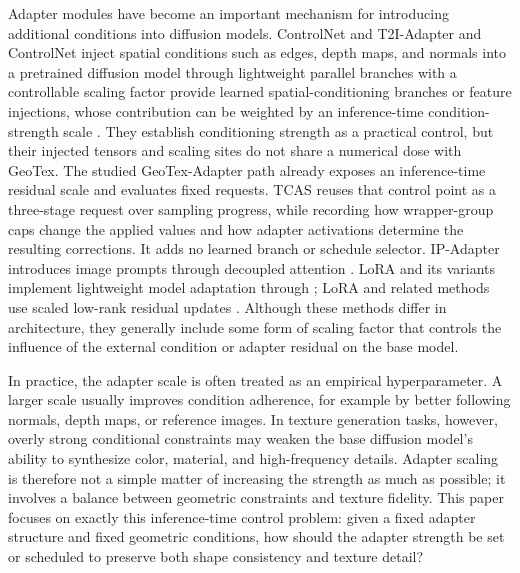 \documentclass[times,twocolumn,final]{elsarticle}
\providecommand{\DIFadd}[1]{{\protect\color{blue} \sf #1}} %
\providecommand{\DIFdel}[1]{{\protect\color{red} \scriptsize #1}} %
\providecommand{\DIFaddbegin}{} %
\providecommand{\DIFaddend}{} %
\providecommand{\DIFdelbegin}{} %
\providecommand{\DIFdelend}{} %
\begin{document}
\DIFdelbegin \DIFdel{Adapter modules have become an important mechanism for introducing additional conditions into diffusion models. }\DIFdelend \DIFaddbegin \DIFadd{ControlNet and }\DIFaddend T2I-Adapter \DIFdelbegin \DIFdel{and ControlNet inject spatial conditions such as edges, depth maps, and normals into a pretrained diffusion model through lightweight parallel branches with a controllable scaling factor \cite{mou2023t2iadapter,zhang2023controlnet}}\DIFdelend \DIFaddbegin \DIFadd{provide learned spatial-conditioning branches or feature injections, whose contribution can be weighted by an inference-time condition-strength scale \cite{mou2023t2iadapter,zhang2023controlnet}. They establish conditioning strength as a practical control, but their injected tensors and scaling sites do not share a numerical dose with GeoTex. The studied GeoTex-Adapter path already exposes an inference-time residual scale and evaluates fixed requests. TCAS reuses that control point as a three-stage request over sampling progress, while recording how wrapper-group caps change the applied values and how adapter activations determine the resulting corrections. It adds no learned branch or schedule selector}\DIFaddend . IP-Adapter introduces image prompts through decoupled attention \cite{ye2023ipadapter}\DIFdelbegin \DIFdel{. LoRA and its variants implement lightweight model adaptation through }\DIFdelend \DIFaddbegin \DIFadd{; LoRA and related methods use scaled }\DIFaddend low-rank \DIFdelbegin \DIFdel{residual }\DIFdelend updates \cite{hu2022lora,liu2024dora,zhang2023adalora}.
\DIFdelbegin \DIFdel{Although these methods differ in architecture, they generally include some form of scaling factor that controls the influence of the external condition or adapter residual on the base model.
}%

\DIFdel{In practice, the adapter scale is often treated as an empirical hyperparameter. A larger scale usually improves condition adherence, for example by better following normals, depth maps, or reference images. In texture generation tasks, however, overly strong conditional constraints may weaken the base diffusion model's ability to synthesize color, material, and high-frequency details. Adapter scaling is therefore not a simple matter of increasing the strength as much as possible; it involves a balance between geometric constraints and texture fidelity. This paper focuses on exactly this inference-time control problem: given a fixed adapter structure and fixed geometric conditions, how should the adapter strength be set or scheduled to preserve both shape consistency and texture detail?
}\DIFdelend 
\end{document}
